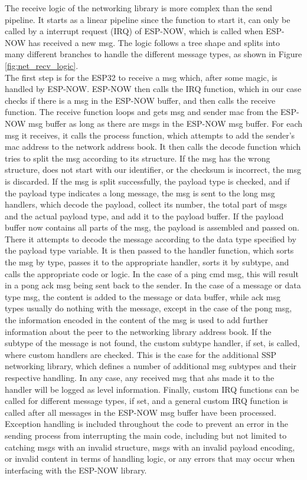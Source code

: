 The receive logic of the networking library is more complex than the send pipeline. It starts as a linear pipeline since the function to start it, can only be called by a interrupt request (IRQ) of ESP-NOW, which is called when ESP-NOW has received a new msg. The logic follows a tree shape and splits into many different branches to handle the different message types, as shown in Figure \ref{fig:net_recv_logic}. \\
The first step is for the ESP32 to receive a msg which, after some magic, is handled by ESP-NOW. ESP-NOW then calls the IRQ function, which in our case checks if there is a msg in the ESP-NOW buffer, and then calls the receive function. The receive function loops and gets msg and sender mac from the ESP-NOW msg buffer as long as there are msgs in the ESP-NOW msg buffer. For each msg it receives, it calls the process function, which attempts to add the sender's mac address to the network address book. It then calls the decode function which tries to split the msg according to its structure. If the msg has the wrong structure, does not start with our identifier, or the checksum is incorrect, the msg is discarded. If the msg is split successfully, the payload type is checked, and if the payload type indicates a long message, the msg is sent to the long msg handlers, which decode the payload, collect its number, the total part of msgs and the actual payload type, and add it to the payload buffer. If the payload buffer now contains all parts of the msg, the payload is assembled and passed on. There it attempts to decode the message according to the data type specified by the payload type variable. It is then passed to the handler function, which sorts the msg by type, passes it to the appropriate handler, sorts it by subtype, and calls the appropriate code or logic. In the case of a ping cmd msg, this will result in a pong ack msg being sent back to the sender. In the case of a message or data type msg, the content is added to the message or data buffer, while ack msg types usually do nothing with the message, except in the case of the pong msg, the information encoded in the content of the msg is used to add further information about the peer to the networking library address book. If the subtype of the message is not found, the custom subtype handler, if set, is called, where custom handlers are checked. This is the case for the additional SSP networking library, which defines a number of additional msg subtypes and their respective handling. In any case, any received msg that ahs made it to the handler will be logged as level information. Finally, custom IRQ functions can be called for different message types, if set, and a general custom IRQ function is called after all messages in the ESP-NOW msg buffer have been processed. \\
Exception handling is included throughout the code to prevent an error in the sending process from interrupting the main code, including but not limited to catching msgs with an invalid structure, msgs with an invalid payload encoding, or invalid content in terms of handling logic, or any errors that may occur when interfacing with the ESP-NOW library.

